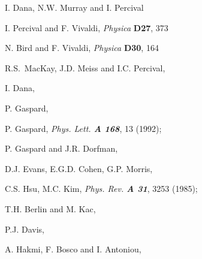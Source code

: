 { I. Dana, N.W. Murray and I. Percival

 I. Percival and F. Vivaldi, {\em Physica} {\bf D27}, 373

 N. Bird and F. Vivaldi, {\em Physica} {\bf D30}, 164

 R.S.~MacKay, J.D. Meiss and I.C. Percival,


 I. Dana,

 P. Gaspard,

 P. Gaspard, {\em Phys. Lett. \bf A 168}, 13 (1992);

 P. Gaspard and J.R. Dorfman,

D.J. Evans, E.G.D. Cohen, G.P. Morris,

C.S. Hsu, M.C. Kim, {\em Phys. Rev. \bf A 31}, 3253 (1985);

 T.H. Berlin and M. Kac,

 P.J. Davis,


  A. Hakmi, F. Bosco and I. Antoniou,

}

